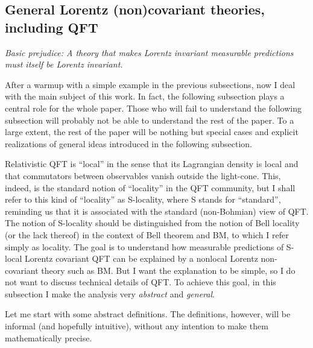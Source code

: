 \documentclass[12pt]{article}
\begin{document}
\subsection{General Lorentz (non)covariant theories, including QFT}
\label{SECgen}

\begin{flushright}
{\it Basic prejudice: A theory that makes Lorentz invariant measurable predictions must itself be Lorentz invariant.} 
\end{flushright}


After a warmup with a simple example in the previous subsections, now I deal
with the main subject of this work. In fact, the following subsection plays a central role
for the whole paper.  
Those who will fail to understand the following subsection will
probably not be able to understand the rest of the paper. To a large extent, the rest of the paper 
will be nothing but special cases and explicit realizations of general ideas introduced in the following subsection.
 
Relativistic QFT is ``local'' in the sense that its Lagrangian density is local
and that commutators between observables vanish outside the light-cone.
This, indeed, is the standard notion of ``locality'' in the QFT community,
but I shall refer to this kind of ``locality'' as S-locality, where S stands for 
``standard'', reminding us that it is associated with the standard (non-Bohmian) view of QFT.
The notion of S-locality should be distinguished from the notion of Bell locality (or the lack thereof) 
in the context of Bell theorem and BM, to which I refer simply as locality. 
The goal is to understand how measurable predictions of 
S-local Lorentz covariant QFT can be explained by a nonlocal
Lorentz non-covariant theory such as BM.
But I want the explanation to be simple, so I do not want to discuss 
technical details of QFT.
To achieve this goal, in this subsection I make the analysis very {\em abstract} and {\em general}.

Let me start with some abstract definitions. The definitions, however, will be informal 
(and hopefully intuitive), without any intention to make them mathematically precise.
\end{document}
